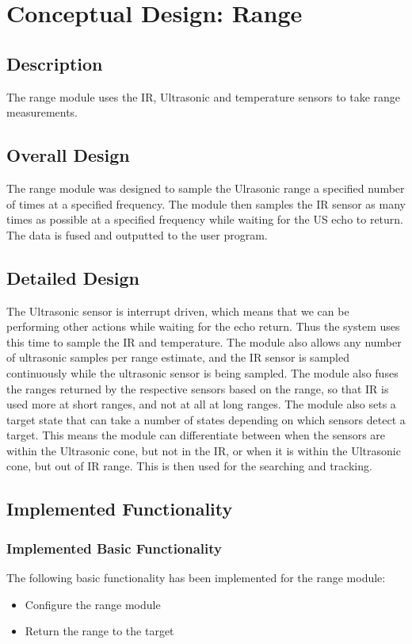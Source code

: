 \documentclass[]{report}
\begin{document}
\section{Conceptual Design: Range}
\subsection{Description}
The range module uses the IR, Ultrasonic and temperature sensors to take range measurements.

\subsection{Overall Design}
The range module was designed to sample the Ulrasonic range a specified number of times at a specified frequency. The module then samples the IR sensor as many times as possible at a specified frequency while waiting for the US echo to return. The data is fused and outputted to the user program.

\subsection{Detailed Design}
The Ultrasonic sensor is interrupt driven, which means that we can be performing other actions while waiting for the echo return. Thus the system uses this time to sample the IR and temperature. The module also allows any number of ultrasonic samples per range estimate, and the IR sensor is sampled continuously while the ultrasonic sensor is being sampled. The module also fuses the ranges returned by the respective sensors based on the range, so that IR is used more at short ranges, and not at all at long ranges. The module also sets a target state that can take a number of states depending on which sensors detect a target. This means the module can differentiate between when the sensors are within the Ultrasonic cone, but not in the IR, or when it is within the Ultrasonic cone, but out of IR range. This is then used for the searching and tracking. 

\subsection{Implemented Functionality}
\subsubsection{Implemented Basic Functionality}
The following basic functionality has been implemented for the range module:
\begin{itemize}
	\item Configure the range module
	\item Return the range to the target
\end{itemize}
\end{document}
